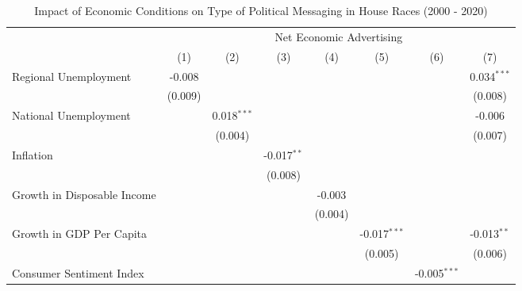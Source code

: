 
\begin{table}[htbp]
   \caption{Impact of Economic Conditions on Type of Political Messaging in House Races (2000 - 2020)}
   \bigskip
   \centering
   \small
   \begin{tabular}{lccccccc}
      \toprule
       & \multicolumn{7}{c}{Net Economic Advertising}\\
                                     & (1)           & (2)           & (3)           & (4)           & (5)            & (6)            & (7)\\  
      \midrule 
      Regional Unemployment          & -0.008        &               &               &               &                &                & 0.034$^{***}$\\   
                                     & (0.009)       &               &               &               &                &                & (0.008)\\   
      National Unemployment          &               & 0.018$^{***}$ &               &               &                &                & -0.006\\   
                                     &               & (0.004)       &               &               &                &                & (0.007)\\   
      Inflation                      &               &               & -0.017$^{**}$ &               &                &                &   \\   
                                     &               &               & (0.008)       &               &                &                &   \\   
      Growth in Disposable Income    &               &               &               & -0.003        &                &                &   \\   
                                     &               &               &               & (0.004)       &                &                &   \\   
      Growth in GDP Per Capita       &               &               &               &               & -0.017$^{***}$ &                & -0.013$^{**}$\\   
                                     &               &               &               &               & (0.005)        &                & (0.006)\\   
      Consumer Sentiment Index       &               &               &               &               &                & -0.005$^{***}$ &   \\   

\end{tabular}
\end{table}
